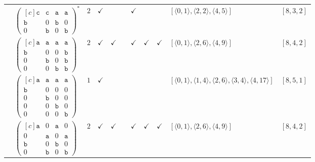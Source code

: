 \documentclass[12pt]{article}
\theoremstyle{definition}
\theoremstyle{plain}
\begin{document}
{\begin{longtable}{@{}cYcccccccZc@{}}
\cmidrule(lr){2-11}


& $\begin{pmatrix*}[c]
\mathtt{c}  &  \mathtt{c}  &  \mathtt{a}  &  \mathtt{a}  \\
\mathtt{b}  &  0  &  \mathtt{b}  &  0   \\
0  &  \mathtt{b}  &  0  &  \mathtt{b}
\end{pmatrix*}^*$
& $2$
& $\checkmark$
&
&
& $\checkmark$
&
&
& $[\langle0,1\rangle,\allowbreak\langle2,2\rangle,\allowbreak\langle4,5\rangle]$
& $[8,3,2]$\\

\cmidrule(lr){2-11}

& $\begin{pmatrix*}[c]
\mathtt{a}  &  \mathtt{a}  &  \mathtt{a}  &  \mathtt{a}  \\
\mathtt{b}  &  0  &  0  &  \mathtt{b}   \\
0  &  \mathtt{b}  &  0  &  \mathtt{b}   \\
0  &  0  &  \mathtt{b}  &  \mathtt{b}
\end{pmatrix*}$
& $2$
& $\checkmark$
& $\checkmark$
&
& $\checkmark$
& $\checkmark$
& $\checkmark$
& $[\langle0,1\rangle,\allowbreak\langle2,6\rangle,\allowbreak\langle4,9\rangle]$
& $[8,4,2]$\\

\cmidrule(lr){2-11}

& $\begin{pmatrix*}[c]
\mathtt{a}  &  \mathtt{a}  &  \mathtt{a}  &  \mathtt{a}  \\
\mathtt{b}  &  0  &  0  & 0   \\
0  &  \mathtt{b}  &  0  & 0  \\
0  &  0  &  \mathtt{b}  &  0  \\
0  & 0  &  0  &  \mathtt{b}
\end{pmatrix*}$
& $1$
& $\checkmark$
&
&
&
&
&
& $[\langle0,1\rangle,\allowbreak\langle1,4\rangle,\allowbreak\langle2,6\rangle,\allowbreak\langle3,4\rangle,\allowbreak\langle4,17\rangle]$
& $[8,5,1]$    \\

\cmidrule(lr){2-11}

& $\begin{pmatrix*}[c]
\mathtt{a}  &  0  &  \mathtt{a}  &  0  \\
0  &  \mathtt{a}  &  0  &  \mathtt{a}  \\
\mathtt{b}  &  0  &  \mathtt{b}  &  0  \\
0  &  \mathtt{b}  &  0  &  \mathtt{b}
\end{pmatrix*}$
& $2$
& $\checkmark$
& $\checkmark$
&
& $\checkmark$
& $\checkmark$
& $\checkmark$
& $[\langle0,1\rangle,\allowbreak\langle2,6\rangle,\allowbreak\langle4,9\rangle]$
& $[8,4,2]$\\


\end{longtable}}
\end{document}
